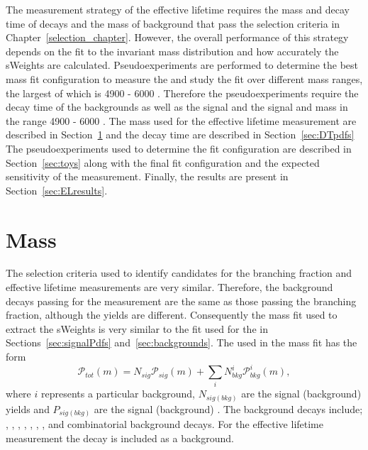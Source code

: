 The measurement strategy of the \bsmumu effective lifetime requires the mass and decay time \pdfs of \bsmumu decays and the mass \pdfs of background that pass the selection criteria in Chapter~\ref{selection_chapter}. However, the overall performance of this strategy depends on the fit to the invariant mass distribution and how accurately the sWeights are calculated.
Pseudoexperiments are performed to determine the best mass fit configuration to measure the \el and study the fit over different \bsmumu mass ranges, the largest of which is 4900 - 6000 \mevcc. Therefore the pseudoexperiments require the decay time \pdfs of the backgrounds as well as the signal and the signal and mass \pdfs in the range 4900 - 6000 \mevcc.
The mass \pdfs used for the effective lifetime measurement are described in Section~\ref{sec:ELmasspdfs} and the decay time \pdfs are described in Section~\ref{sec:DTpdfs} 
The pseudoexperiments used to determine the fit configuration are described in Section~\ref{sec:toys} along with the final fit configuration and the expected sensitivity of the measurement. 
Finally, the results are present in Section~\ref{sec:ELresults}. 





\section{Mass \pdfs}
\label{sec:ELmasspdfs}
The selection criteria used to identify \bsmumu candidates for the \bmumu branching fraction and \bsmumu effective lifetime measurements are very similar. 
Therefore, the background decays passing for the \el measurement are the same as those passing the branching fraction, although the yields are different. %
Consequently the mass fit used to extract the sWeights is very similar to the fit used for the \BFm in Sections~\ref{sec:signalPdfs} and~\ref{sec:backgrounds}. The \pdf used in the mass fit has the form
\begin{equation}
\mathcal{P}_{tot}(m) = N_{sig}\mathcal{P}_{sig}(m) + \displaystyle\sum_{i} N^i_{bkg}\mathcal{P}^i_{bkg}(m),
\label{eq:masspdf}
\end{equation}
where $i$ represents a particular background, $N_{sig(bkg)}$ are the signal (background) yields and $P_{sig(bkg)}$ are the signal (background) \pdfs. The background decays include; \bdmumu, \bhh, \lambdab, \bdpimunu, \bsKmunu, \bupimumu, \bdpimumu, \bcjpsimunu and combinatorial background decays. For the effective lifetime measurement the \bdmumu decay is included as a background. 


